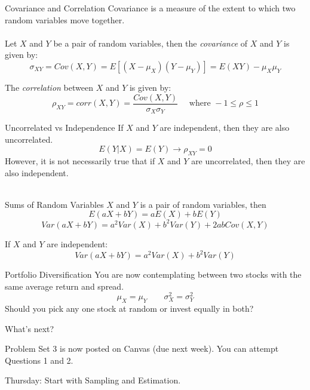 \documentclass{./../div_teaching_slides}
\begin{document}
\begin{frame}{Covariance and Correlation}
Covariance is a measure of the extent to which two random variables move
together. \\~\\
Let $X$ and $Y$ be a pair of random variables, then the \textit{covariance} of $X$ and $Y$ is given by:
$$ \sigma_{XY} = Cov(X,Y) = E[(X-\mu_X)(Y-\mu_Y)] = E(XY)-\mu_X \mu_Y $$ 
\vspace{0.15em}

The \textit{correlation} between $X$ and $Y$ is given by:
$$ \rho_{XY} = corr(X,Y) = \frac{Cov(X,Y)}{\sigma_X \sigma_Y} \quad \text{ where } -1 \leq \rho \leq 1$$
\end{frame}

\begin{frame}{Uncorrelated vs Independence}
If $X$ and $Y$ are independent, then they are also uncorrelated. 
$$ E(Y|X) = E(Y) \rightarrow \rho_{XY} = 0 $$
However, it is not necessarily true that if $X$ and $Y$ are uncorrelated, then they are also independent. \\~\\
\end{frame}

\begin{frame}{Sums of Random Variables}
$X$ and $Y$ is a pair of random variables, then
$$ E(aX+bY) = aE(X) + bE(Y) $$
$$ Var(aX+bY) = a^2Var(X) + b^2 Var(Y) + 2 ab Cov(X,Y) $$

\vspace{1em}
If $X$ and $Y$ are independent:
$$ Var(aX+bY) = a^2 Var(X) + b^2 Var(Y) $$
\end{frame}

\begin{frame}{Portfolio Diversification}
You are now contemplating between two stocks with the same average return and spread.  
$$ \mu_X = \mu_Y \quad \quad \sigma^2_X = \sigma^2_Y $$
Should you pick any one stock at random or invest equally in both?
\end{frame}

\begin{frame}{What's next?}
\begin{witemize}
  \item Problem Set 3 is now posted on Canvas (due next week). You can attempt Questions 1 and 2. 
  \item Thursday: Start with Sampling and Estimation. 
\end{witemize}
\end{frame}
\end{document}
